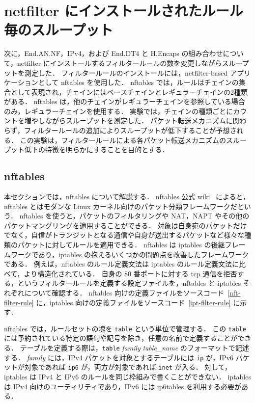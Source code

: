 \section{netfilter にインストールされたルール毎のスループット}
\label{sec:eval.thru-chains}
次に，End.AN.NF，IPv4，および End.DT4 と H.Encaps の組み合わせについて，netfilter にインストールするフィルタールールの数を変更しながらスループットを測定した．
フィルタールールのインストールには，netfilter-based アプリケーションとして nftables を使用した．
nftables では，ルールはチェインの集合として表現され，チェインにはベースチェインとレギュラーチェインの2種類がある．
nftables は，他のチェインがレギュラーチェインを参照している場合のみ，レギュラーチェインを使用する．
実験では，チェインの種類ごとにカウントを増やしながらスループットを測定した．
パケット転送メカニズムに関わらず，フィルタールールの追加によりスループットが低下することが予想される．
この実験は，フィルタールールによる各パケット転送メカニズムのスループット低下の特徴を明らかにすることを目的とする．

\subsection{nftables}
\label{ssec:thru-chains.nftables}
本セクションでは，nftables について解説する．
nftables 公式 wiki~\cite{about-nftables} によると，nftables とはモダンな Linux カーネル向けのパケット分類フレームワークだという．
nftables を使うと，パケットのフィルタリングや NAT，NAPT やその他のパケットマングリングを適用することができる．
対象は自身宛のパケットだけでなく，自信がトランジットとなる通信や自身が送出するパケットなど様々な種類のパケットに対してルールを適用できる．
nftables は iptables の後継フレームワークであり，iptables の抱えるいくつかの問題点を改善したフレームワークである．
例えば，nftables のルール定義文法は iptables のルール定義文法に比べて，より構造化されている．
自身の 80 番ポートに対する tcp 通信を拒否する，というフィルタールールを定義する設定ファイルを，nftables と iptables それぞれについて確認する．
nftables 向けの定義ファイルをソースコード~\ref*{nft-filter-rule} に，iptables 向けの定義ファイルをソースコード~\ref*{ipt-filter-rule} に示す．

nftables では，ルールセットの塊を \texttt{table} という単位で管理する．
この \texttt{table} には予約されている特定の語句や記号を除き，任意の名前で定義することができる．
テーブルを定義する際は，\texttt{table} \textit{family} \textit{table\_name} のフォーマットで記述する．
\textit{family} には，IPv4 パケットを対象とするテーブルには \texttt{ip} が，IPv6 パケットが対象であれば \texttt{ip6} が，両方が対象であれば  \texttt{inet} が入る．
対して，iptables は IPv4 と IPv6 のルールを同じ枠組みで書くことができない．
iptables は IPv4 向けのユーティリティであり，IPv6 には ip6tables を利用する必要がある．

